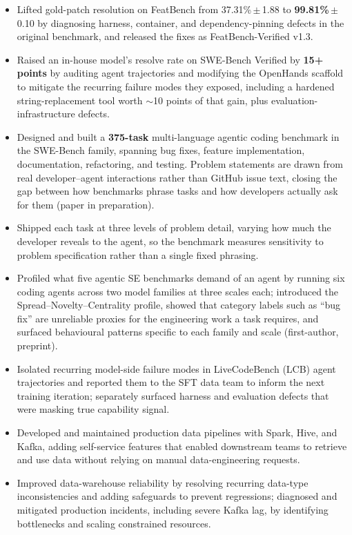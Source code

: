 \documentclass[11pt,letterpaper]{article}
\begin{document}
\begin{itemize}
  \item Lifted gold-patch resolution on FeatBench from 37.31\%\,{\small$\pm$\,1.88} to \textbf{99.81\%}\,{\small$\pm$\,0.10} by diagnosing harness, container, and dependency-pinning defects in the original benchmark, and released the fixes as FeatBench-Verified v1.3.
  \item Raised an in-house model's resolve rate on SWE-Bench Verified by \textbf{15+ points} by auditing agent trajectories and modifying the OpenHands scaffold to mitigate the recurring failure modes they exposed, including a hardened string-replacement tool worth $\sim$10 points of that gain, plus evaluation-infrastructure defects.
  \item Designed and built a \textbf{375-task} multi-language agentic coding benchmark in the SWE-Bench family, spanning bug fixes, feature implementation, documentation, refactoring, and testing. Problem statements are drawn from real developer--agent interactions rather than GitHub issue text, closing the gap between how benchmarks phrase tasks and how developers actually ask for them (paper in preparation).
  \item Shipped each task at three levels of problem detail, varying how much the developer reveals to the agent, so the benchmark measures sensitivity to problem specification rather than a single fixed phrasing.
  \item Profiled what five agentic SE benchmarks demand of an agent by running six coding agents across two model families at three scales each; introduced the Spread--Novelty--Centrality profile, showed that category labels such as ``bug fix'' are unreliable proxies for the engineering work a task requires, and surfaced behavioural patterns specific to each family and scale (first-author, preprint).
  \item Isolated recurring model-side failure modes in LiveCodeBench (LCB) agent trajectories and reported them to the SFT data team to inform the next training iteration; separately surfaced harness and evaluation defects that were masking true capability signal.
\end{itemize}

\begin{itemize}
  \item Developed and maintained production data pipelines with Spark, Hive, and Kafka, adding self-service features that enabled downstream teams to retrieve and use data without relying on manual data-engineering requests.
  \item Improved data-warehouse reliability by resolving recurring data-type inconsistencies and adding safeguards to prevent regressions; diagnosed and mitigated production incidents, including severe Kafka lag, by identifying bottlenecks and scaling constrained resources.
\end{itemize}
\end{document}
